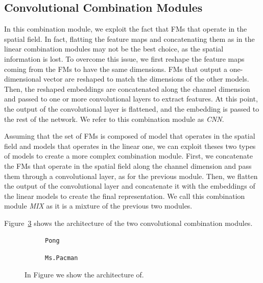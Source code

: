 \subsection{Convolutional Combination Modules}
\label{sec:convolutional_combination}
In this combination module, we exploit the fact that FMs that operate in the spatial field.
In fact, flatting the feature maps and concatenating them as in the linear combination modules may not be the best choice, as the spatial information is lost.
To overcome this issue, we first reshape the feature maps coming from the FMs to have the same dimensions.
FMs that output a one-dimensional vector are reshaped to match the dimensions of the other models.
Then, the reshaped embeddings are concatenated along the channel dimension and passed to one or more convolutional layers to extract features.
At this point, the output of the convolutional layer is flattened, and the embedding is passed to the rest of the network.
We refer to this combination module as \textit{CNN}.


Assuming that the set of FMs is composed of model that operates in the spatial field and models that operates in the linear one, we can exploit theses two types of models to create a more complex combination module.
First, we concatenate the FMs that operate in the spatial field along the channel dimension and pass them through a convolutional layer, as for the previous module.
Then, we flatten the output of the convolutional layer and concatenate it with the embeddings of the linear models to create the final representation.
We call this combination module \textit{MIX} as it is a mixture of the previous two modules.

Figure~\ref{fig:conv_combination} shows the architecture of the two convolutional combination modules.

\begin{figure}[ht]
    \centering
    \begin{subfigure}[b]{0.47\textwidth}
        \centering
        \fbox{\rule[-.5cm]{0cm}{4cm} \rule[-.5cm]{4cm}{0cm}}
        \caption{\texttt{Pong}}
        \label{fig:cnn}
    \end{subfigure}
    \hfill
    \begin{subfigure}[b]{0.47\textwidth}
        \centering
        \fbox{\rule[-.5cm]{0cm}{4cm} \rule[-.5cm]{4cm}{0cm}}
        \caption{\texttt{Ms.Pacman}}
        \label{fig:mix}
    \end{subfigure}

    \caption{In Figure we show the architecture of.}
    \label{fig:conv_combination}
\end{figure}

